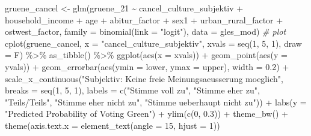 \documentclass[
]{article}
\newenvironment{Shaded}{\begin{snugshade}}{\end{snugshade}}
\newcommand{\AttributeTok}[1]{\textcolor[rgb]{0.77,0.63,0.00}{#1}}
\newcommand{\CommentTok}[1]{\textcolor[rgb]{0.56,0.35,0.01}{\textit{#1}}}
\newcommand{\DecValTok}[1]{\textcolor[rgb]{0.00,0.00,0.81}{#1}}
\newcommand{\FloatTok}[1]{\textcolor[rgb]{0.00,0.00,0.81}{#1}}
\newcommand{\FunctionTok}[1]{\textcolor[rgb]{0.00,0.00,0.00}{#1}}
\newcommand{\NormalTok}[1]{#1}
\newcommand{\OtherTok}[1]{\textcolor[rgb]{0.56,0.35,0.01}{#1}}
\newcommand{\SpecialCharTok}[1]{\textcolor[rgb]{0.00,0.00,0.00}{#1}}
\newcommand{\StringTok}[1]{\textcolor[rgb]{0.31,0.60,0.02}{#1}}
\begin{document}
\begin{Shaded}
\begin{Highlighting}[]
\NormalTok{gruene\_cancel }\OtherTok{\textless{}{-}} \FunctionTok{glm}\NormalTok{(gruene\_21 }\SpecialCharTok{\textasciitilde{}}\NormalTok{ cancel\_culture\_subjektiv }\SpecialCharTok{+}\NormalTok{ household\_income }\SpecialCharTok{+}\NormalTok{ age }\SpecialCharTok{+}\NormalTok{ abitur\_factor }\SpecialCharTok{+}\NormalTok{ sex1 }\SpecialCharTok{+}\NormalTok{ urban\_rural\_factor }\SpecialCharTok{+}\NormalTok{ ostwest\_factor, }\AttributeTok{family =} \FunctionTok{binomial}\NormalTok{(}\AttributeTok{link =} \StringTok{"logit"}\NormalTok{), }\AttributeTok{data =}\NormalTok{ gles\_mod)}
\CommentTok{\# plot}
\FunctionTok{cplot}\NormalTok{(gruene\_cancel, }\AttributeTok{x =} \StringTok{"cancel\_culture\_subjektiv"}\NormalTok{, }
      \AttributeTok{xvals =} \FunctionTok{seq}\NormalTok{(}\DecValTok{1}\NormalTok{, }\DecValTok{5}\NormalTok{, }\DecValTok{1}\NormalTok{), }\AttributeTok{draw =}\NormalTok{ F) }\SpecialCharTok{\%\textgreater{}\%}
  \FunctionTok{as\_tibble}\NormalTok{() }\SpecialCharTok{\%\textgreater{}\%}
  \FunctionTok{ggplot}\NormalTok{(}\FunctionTok{aes}\NormalTok{(}\AttributeTok{x =}\NormalTok{ xvals)) }\SpecialCharTok{+}
  \FunctionTok{geom\_point}\NormalTok{(}\FunctionTok{aes}\NormalTok{(}\AttributeTok{y =}\NormalTok{ yvals)) }\SpecialCharTok{+}
  \FunctionTok{geom\_errorbar}\NormalTok{(}\FunctionTok{aes}\NormalTok{(}\AttributeTok{ymin =}\NormalTok{ lower, }\AttributeTok{ymax =}\NormalTok{ upper), }\AttributeTok{width =} \FloatTok{0.2}\NormalTok{) }\SpecialCharTok{+}
  \FunctionTok{scale\_x\_continuous}\NormalTok{(}\StringTok{"Subjektiv: Keine freie Meinungsaeusserung moeglich"}\NormalTok{, }
                   \AttributeTok{breaks =} \FunctionTok{seq}\NormalTok{(}\DecValTok{1}\NormalTok{, }\DecValTok{5}\NormalTok{, }\DecValTok{1}\NormalTok{),}
                   \AttributeTok{labels =} \FunctionTok{c}\NormalTok{(}\StringTok{"Stimme voll zu"}\NormalTok{, }\StringTok{"Stimme eher zu"}\NormalTok{,}
                              \StringTok{"Teils/Teils"}\NormalTok{, }\StringTok{"Stimme eher nicht zu"}\NormalTok{,}
                              \StringTok{"Stimme ueberhaupt nicht zu"}\NormalTok{)) }\SpecialCharTok{+}
  \FunctionTok{labs}\NormalTok{(}\AttributeTok{y =} \StringTok{"Predicted Probability of Voting Green"}\NormalTok{) }\SpecialCharTok{+}
  \FunctionTok{ylim}\NormalTok{(}\FunctionTok{c}\NormalTok{(}\DecValTok{0}\NormalTok{, }\FloatTok{0.3}\NormalTok{)) }\SpecialCharTok{+}
  \FunctionTok{theme\_bw}\NormalTok{() }\SpecialCharTok{+}
  \FunctionTok{theme}\NormalTok{(}\AttributeTok{axis.text.x =} \FunctionTok{element\_text}\NormalTok{(}\AttributeTok{angle =} \DecValTok{15}\NormalTok{, }\AttributeTok{hjust =} \DecValTok{1}\NormalTok{))}
\end{Highlighting}
\end{Shaded}
\end{document}
